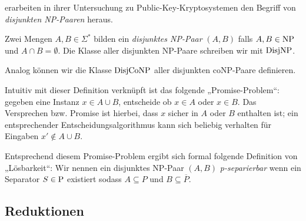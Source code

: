 \textcite{grollmann_complexity_1988} erarbeiten in ihrer Untersuchung zu Public-Key-Kryptosystemen den Begriff von \emph{disjunkten NP-Paaren} heraus.

\begin{definition}[$\DisjNP, \DisjCoNP$]
    Zwei Mengen $A,B\in\Sigma^*$ bilden ein \emph{disjunktes NP-Paar} $(A,B)$ falls $A,B\in\NP$ und $A\cap B = \emptyset$.
    Die Klasse aller disjunkten NP-Paare schreiben wir mit $\DisjNP$.
    
    Analog können wir die Klasse $\DisjCoNP$ aller disjunkten coNP-Paare definieren.
\end{definition}
Intuitiv mit dieser Definition verknüpft ist das folgende „Promise-Problem“: gegeben eine Instanz $x\in A\cup B$, entscheide ob $x\in A$ oder $x\in B$. Das Versprechen bzw. Promise ist hierbei, dass $x$ sicher in $A$ oder $B$ enthalten ist; ein entsprechender Entscheidungsalgorithmus kann sich beliebig verhalten für Eingaben $x'\not\in A\cup B$.

Entsprechend diesem Promise-Problem ergibt sich formal folgende Definition von „Lösbarkeit“:
Wir nennen ein disjunktes NP-Paar $(A,B)$ \emph{p-separierbar} wenn ein Separator $S\in\P$ existiert sodass $A\subseteq P$ und $B\subseteq\overline{P}$.

\subsection*{Reduktionen}

